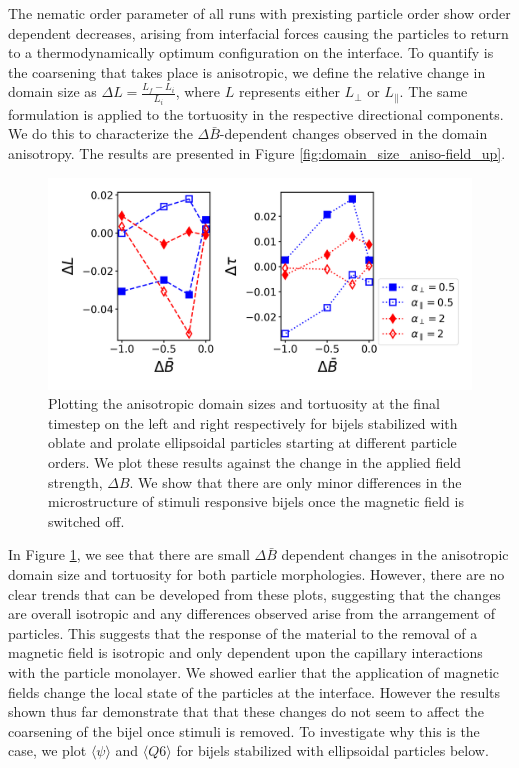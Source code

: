 The nematic order parameter of all runs with prexisting particle order
show order dependent decreases, arising from interfacial forces causing
the particles to return to a thermodynamically optimum configuration on
the interface. To quantify is the coarsening that takes place is
anisotropic, we define the relative change in domain size as
\(\Delta L = \frac{L_{f} - L_{i}}{L_{i}}\), where \(L\) represents
either \(L_{\perp}\) or \(L_{\parallel}\). The same formulation is
applied to the tortuosity in the respective directional components. We
do this to characterize the \(\Delta \bar{B}\)-dependent changes
observed in the domain anisotropy. The results are presented in Figure
\ref{fig:domain_size_aniso-field_up}.

\begin{figure} 
\centering 
\includegraphics[scale = 0.5]{../figures/results/paper2/domain_size_aniso-field_down.png} 
\caption{Plotting the anisotropic domain sizes and tortuosity at the final timestep on the left and right respectively for bijels stabilized with oblate and prolate ellipsoidal particles starting at different particle orders. We plot these results against the change in the applied field strength, $\Delta B$. We show that there are only minor differences in the microstructure of stimuli responsive bijels once the magnetic field is switched off.} 
\label{fig:domain_size_aniso-field_down} 
\end{figure}

In Figure \ref{fig:domain_size_aniso-field_down}, we see that there are
small \(\Delta \bar{B}\) dependent changes in the anisotropic domain
size and tortuosity for both particle morphologies. However, there are
no clear trends that can be developed from these plots, suggesting that
the changes are overall isotropic and any differences observed arise
from the arrangement of particles. This suggests that the response of
the material to the removal of a magnetic field is isotropic and only
dependent upon the capillary interactions with the particle monolayer.
We showed earlier that the application of magnetic fields change the
local state of the particles at the interface. However the results shown
thus far demonstrate that that these changes do not seem to affect the
coarsening of the bijel once stimuli is removed. To investigate why this
is the case, we plot $\langle \psi \rangle$ and
$\langle Q6 \rangle$ for bijels stabilized with ellipsoidal particles
below.

